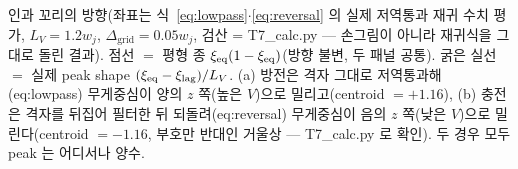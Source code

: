 \caption{인과 꼬리의 방향(좌표는 식~\eqref{eq:lowpass}$\cdot$\eqref{eq:reversal} 의 실제 저역통과 재귀
수치 평가, $L_V{=}1.2w_j$, $\Delta_\mathrm{grid}{=}0.05w_j$, 검산 = T7\_calc.py — 손그림이 아니라 재귀식을
그대로 돌린 결과). 점선 $=$ 평형 종 $\xi_\eq(1-\xi_\eq)$(방향 불변, 두 패널 공통). 굵은 실선 $=$ 실제 peak
shape $(\xi_\eq-\xi_\mathrm{lag})/L_V$. (a) 방전은 격자 그대로 저역통과해(eq:lowpass) 무게중심이 양의 $z$
쪽(높은 $V$)으로 밀리고(centroid $=+1.16$), (b) 충전은 격자를 뒤집어 필터한 뒤 되돌려(eq:reversal) 무게중심이
음의 $z$ 쪽(낮은 $V$)으로 밀린다(centroid $=-1.16$, 부호만 반대인 거울상 — T7\_calc.py 로 확인). 두 경우
모두 peak 는 어디서나 양수.}
\label{fig:reversal}
